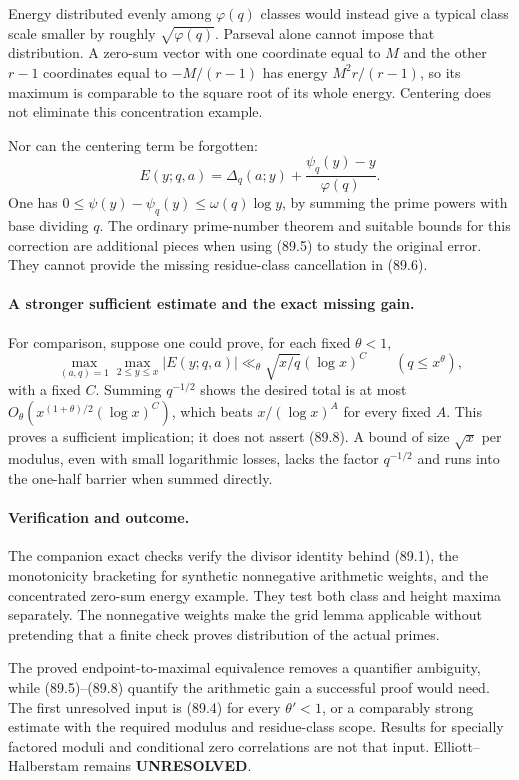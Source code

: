 \documentclass[11pt]{article}
\begin{document}
Energy distributed evenly among $\varphi(q)$ classes would instead give
a typical class scale smaller by roughly $\sqrt{\varphi(q)}$.
Parseval alone cannot impose that distribution. A zero-sum vector with
one coordinate equal to $M$ and the other $r-1$ coordinates equal to
$-M/(r-1)$ has energy $M^2r/(r-1)$, so its maximum is comparable to the
square root of its whole energy. Centering does not eliminate this
concentration example.

Nor can the centering term be forgotten:
\[
 E(y;q,a)=\Delta_q(a;y)+\frac{\psi_q(y)-y}{\varphi(q)}.
                                                               \tag{89.7}
\]
One has $0\leq\psi(y)-\psi_q(y)\leq\omega(q)\log y$, by summing
the prime powers with base dividing $q$. The ordinary prime-number
theorem and suitable bounds for this correction are additional pieces
when using (89.5) to study the original error. They cannot provide the
missing residue-class cancellation in (89.6).

\paragraph{A stronger sufficient estimate and the exact missing gain.}
For comparison, suppose one could prove, for each fixed $\theta<1$,
\[
 \max_{(a,q)=1}\max_{2\leq y\leq x}|E(y;q,a)|
       \ll_\theta \sqrt{x/q}(\log x)^C
             \qquad(q\leq x^\theta),                  \tag{89.8}
\]
with a fixed $C$. Summing $q^{-1/2}$ shows the desired total is at most
$O_\theta(x^{(1+\theta)/2}(\log x)^C)$, which beats
$x/(\log x)^A$ for every fixed $A$. This proves a sufficient implication;
it does not assert (89.8). A bound of size $\sqrt x$ per modulus, even
with small logarithmic losses, lacks the factor $q^{-1/2}$ and runs into
the one-half barrier when summed directly.

\paragraph{Verification and outcome.}
The companion exact checks verify the divisor identity behind (89.1),
the monotonicity bracketing for synthetic nonnegative arithmetic weights,
and the concentrated zero-sum energy example. They test both class and
height maxima separately. The nonnegative weights make the grid lemma
applicable without pretending that a finite check proves distribution
of the actual primes.

The proved endpoint-to-maximal equivalence removes a quantifier ambiguity,
while (89.5)--(89.8) quantify the arithmetic gain a successful proof would
need. The first unresolved input is (89.4) for every $\theta'<1$, or a
comparably strong estimate with the required modulus and residue-class
scope. Results for specially factored moduli and conditional zero
correlations are not that input. Elliott--Halberstam remains
\textbf{UNRESOLVED}.
\end{document}

